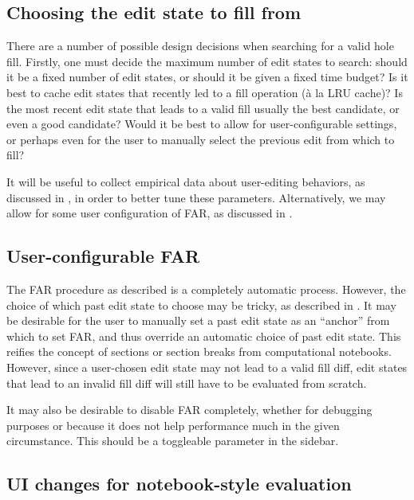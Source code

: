 \subsection{Choosing the edit state to fill from}
\label{sec:far-past-edit-states}

There are a number of possible design decisions when searching for a valid hole fill. Firstly, one must decide the maximum number of edit states to search: should it be a fixed number of edit states, or should it be given a fixed time budget? Is it best to cache edit states that recently led to a fill operation (\`a la LRU cache)? Is the most recent edit state that leads to a valid fill usually the best candidate, or even a good candidate? Would it be best to allow for user-configurable settings, or perhaps even for the user to manually select the previous edit from which to fill?

It will be useful to collect empirical data about user-editing behaviors, as discussed in , in order to better tune these parameters. Alternatively, we may allow for some user configuration of FAR, as discussed in .

\subsection{User-configurable FAR}
\label{sec:far-improv-user-config}

The FAR procedure as described is a completely automatic process. However, the choice of which past edit state to choose may be tricky, as described in . It may be desirable for the user to manually set a past edit state as an ``anchor'' from which to set FAR, and thus override an automatic choice of past edit state. This reifies the concept of sections or section breaks from computational notebooks. However, since a user-chosen edit state may not lead to a valid fill diff, edit states that lead to an invalid fill diff will still have to be evaluated from scratch.

It may also be desirable to disable FAR completely, whether for debugging purposes or because it does not help performance much in the given circumstance. This should be a toggleable parameter in the sidebar.

\subsection{UI changes for notebook-style evaluation}
\label{sec:far-improv-notebook-ui}


